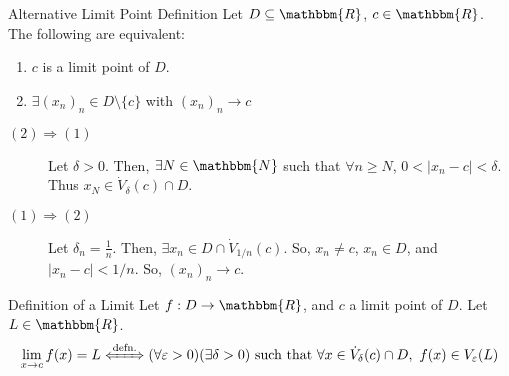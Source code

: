 \documentclass[10pt]{extarticle}
\newcommand{\N}{\mathbbm{N}}
\newcommand{\R}{\mathbbm{R}}
\begin{document}
  \begin{problem}{Alternative Limit Point Definition}
    Let $D\subseteq \R$, $c\in\R$. The following are equivalent:
    \begin{enumerate}[(1)]
      \item $c$ is a limit point of $D$.
      \item $\exists (x_n)_n \in D\setminus \{c\}$ with $(x_n)_n \rightarrow c$
    \end{enumerate}
    \tcblower
    \begin{description}
      \item[$(2) \Rightarrow (1)$] Let $\delta > 0$. Then, $\exists N\in\N$ such that $\forall n\geq N$, $0 < |x_n - c| < \delta$. Thus $x_{N} \in \dot{V}_{\delta}(c) \cap D$.
      \item[$(1) \Rightarrow (2)$] Let $\delta_n = \frac{1}{n}$. Then, $\exists x_n \in D \cap \dot{V}_{1/n}(c)$. So, $x_n \neq c$, $x_n\in D$, and $|x_n - c| < 1/n$. So, $(x_n)_n \rightarrow c$.
    \end{description}
  \end{problem}
  \begin{problem}{Definition of a Limit}
    Let $f: D\rightarrow \R$, and $c$ a limit point of $D$. Let $L \in \R$.
    \begin{align*}
      \lim_{x\rightarrow c} f(x) = L \xLeftrightarrow{\text{defn.}} (\forall \varepsilon > 0)(\exists \delta > 0) \text{ such that } \forall x\in \dot{V}_{\delta}(c)\cap D,~f(x)\in V_{\varepsilon}(L)
    \end{align*}
  \end{problem}
\end{document}
